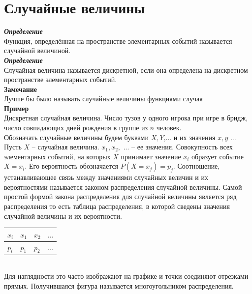 \documentclass[russian, 12pt, fleqn]{article}
\begin{document}
\section{Случайные величины}
\noindent
\textit{\textbf{Определение}}\\
Функция, определённая на пространстве элементарных событий называется случайной величиной.\\
\textit{\textbf{Определение}}\\
Случайная величина называется дискретной, если она определена на дискретном пространстве элементарных событий.\\
\textbf{Замечание\ } \\ Лучше бы было называть случайные величины функциями случая\\
\textbf{Пример\ }\\Дискретная случайная величина. Число тузов у одного игрока при игре в бридж, число совпадающих дней рождения в группе из $n$ человек.\\
Обозначать случайные величины будем буквами $X, Y$,... и их значения $x, y$ ...
Пусть $X$ -- случайная величина. $x_1, x_2,$ ...  --  ее значения. Совокупность всех элементарных событий, на которых $X$ принимает значение $x_i$ образует событие $X=x_i$.
Его вероятность обозначается $P(X=x_j) = p_j$. Соотношение, устанавливающее связь между значениями случайных величин и их вероятностями называется законом распределения случайной величины. Самой простой формой закона распределения для случайной величины является ряд распределения то есть таблица распределения, в которой сведены значения случайной величины и их вероятности. \\
\begin{tabular}[b]{ | l | l | l | l | }
\hline
$x_i$&$x_1$&$x_2$&$...$\\
\hline
$p_i$&$p_1$&$p_2$&$...$\\
\hline
\end{tabular}\\
Для наглядности это часто изображают на графике и точки соединяют отрезками прямых. Получившаяся фигура называется многоугольником распределения. \\
\end{document}
